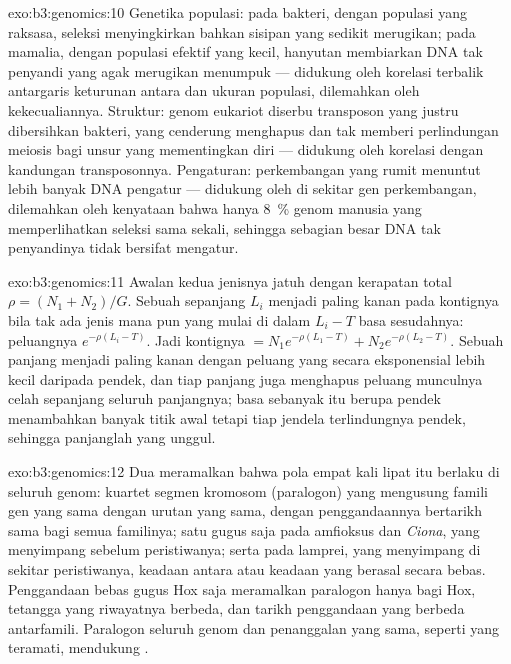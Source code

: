 \begin{solution}{exo:b3:genomics:10}
Genetika populasi: pada bakteri, dengan populasi yang raksasa, seleksi
menyingkirkan bahkan sisipan yang sedikit merugikan; pada mamalia, dengan
populasi efektif yang kecil, hanyutan membiarkan DNA tak penyandi yang agak
merugikan menumpuk --- didukung oleh korelasi terbalik antargaris keturunan
antara  dan ukuran populasi, dilemahkan oleh kekecualiannya.
Struktur: genom eukariot diserbu transposon yang justru dibersihkan
bakteri, yang cenderung menghapus dan tak memberi perlindungan meiosis bagi
unsur yang mementingkan diri --- didukung oleh korelasi 
dengan kandungan transposonnya. Pengaturan: perkembangan yang rumit menuntut
lebih banyak DNA pengatur --- didukung oleh 
di sekitar gen perkembangan, dilemahkan oleh kenyataan bahwa hanya
\qty{8}{\%} genom manusia yang memperlihatkan seleksi sama sekali, sehingga
sebagian besar DNA tak penyandinya tidak bersifat mengatur.
\end{solution}

\begin{solution}{exo:b3:genomics:11}
Awalan kedua jenisnya jatuh dengan kerapatan total $\rho = (N_{1} +
N_{2})/G$. Sebuah  sepanjang $L_{i}$ menjadi  paling kanan pada
kontignya bila tak ada  jenis mana pun yang mulai di dalam $L_{i} - T$
basa sesudahnya: peluangnya $e^{-\rho(L_{i} - T)}$. Jadi kontignya $= N_{1}
e^{-\rho(L_{1} - T)} + N_{2} e^{-\rho(L_{2} - T)}$. Sebuah  panjang
menjadi  paling kanan dengan peluang yang secara eksponensial lebih
kecil daripada  pendek, dan tiap  panjang juga menghapus peluang
munculnya celah sepanjang seluruh panjangnya; basa sebanyak itu berupa 
pendek menambahkan banyak titik awal tetapi tiap jendela terlindungnya pendek,
sehingga  panjanglah yang unggul.
\end{solution}

\begin{solution}{exo:b3:genomics:12}
Dua  meramalkan bahwa pola empat kali lipat itu
berlaku di seluruh genom: kuartet segmen kromosom  (paralogon) yang
mengusung famili gen yang sama dengan urutan yang sama, dengan penggandaannya
bertarikh sama bagi semua familinya; satu gugus saja pada amfioksus dan
\emph{Ciona}, yang menyimpang sebelum peristiwanya; serta pada lamprei, yang
menyimpang di sekitar peristiwanya, keadaan antara atau keadaan yang berasal
secara bebas. Penggandaan bebas gugus Hox saja meramalkan paralogon hanya
bagi Hox, tetangga yang riwayatnya berbeda, dan tarikh penggandaan yang
berbeda antarfamili. Paralogon seluruh genom dan penanggalan yang sama,
seperti yang teramati, mendukung .
\end{solution}

